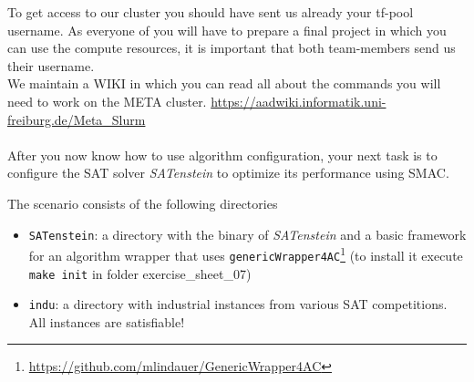 \documentclass{exam}
\begin{document}
	\gccs
	To get access to our cluster you should have sent us already your tf-pool username. As everyone of you will have to prepare a final project in which you can use the compute resources,
	it is important that both team-members send us their username.\\\noindent
	We maintain a WIKI in which you can read all about the commands you will need to work on the META cluster. \url{https://aadwiki.informatik.uni-freiburg.de/Meta_Slurm}\\\\\noindent
	After you now know how to use algorithm configuration,
	your next task is to configure the SAT solver \textit{SATenstein} to optimize its performance using SMAC.
	
	\bigskip
	
	The scenario consists of the following directories
	\begin{itemize}
		\item \texttt{SATenstein}: a directory with the binary of \textit{SATenstein} and a basic framework for an algorithm wrapper that uses \texttt{genericWrapper4AC}\footnote{\url{https://github.com/mlindauer/GenericWrapper4AC}} (to install it execute \texttt{make init} in folder exercise\_sheet\_07)
		\item \texttt{indu}: a directory with industrial instances from various SAT competitions. All instances are satisfiable!
	\end{itemize}
	
\end{document}
